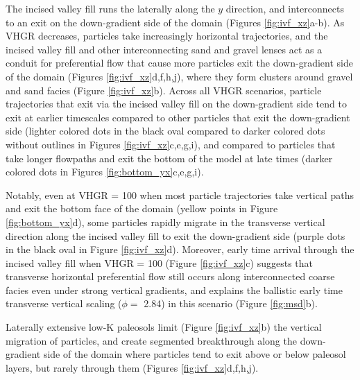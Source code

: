 The incised valley fill runs the laterally along the $y$ direction, and interconnects to an exit on the down-gradient side of the domain (Figures \ref{fig:ivf_xz}a-b). As VHGR decreases, particles take increasingly horizontal trajectories, and the incised valley fill and other interconnecting sand and gravel lenses act as a conduit for preferential flow that cause more particles exit the down-gradient side of the domain (Figures \ref{fig:ivf_xz}d,f,h,j), where they form clusters around gravel and sand facies (Figure \ref{fig:ivf_xz}b). Across all VHGR scenarios, particle trajectories that exit via the incised valley fill on the down-gradient side tend to exit at earlier timescales compared to other particles that exit the down-gradient side (lighter colored dots in the black oval compared to darker colored dots without outlines in Figures \ref{fig:ivf_xz}c,e,g,i), and compared to particles that take longer flowpaths and exit the bottom of the model at late times (darker colored dots in Figures \ref{fig:bottom_yx}c,e,g,i).

Notably, even at VHGR = 100 when most particle trajectories take vertical paths and exit the bottom face of the domain (yellow points in Figure \ref{fig:bottom_yx}d), some particles rapidly migrate in the transverse vertical direction along the incised valley fill to exit the down-gradient side (purple dots in the black oval in Figure \ref{fig:ivf_xz}d). Moreover, early time arrival through the incised valley fill when VHGR = 100 (Figure \ref{fig:ivf_xz}c) suggests that transverse horizontal preferential flow still occurs along interconnected coarse facies even under strong vertical gradients, and explains the ballistic early time transverse vertical scaling ($\phi = $ 2.84) in this scenario (Figure \ref{fig:msd}b).

Laterally extensive low-K paleosols limit (Figure \ref{fig:ivf_xz}b) the vertical migration of particles, and create segmented breakthrough along the down-gradient side of the domain where particles tend to exit above or below paleosol layers, but rarely through them (Figures \ref{fig:ivf_xz}d,f,h,j).



